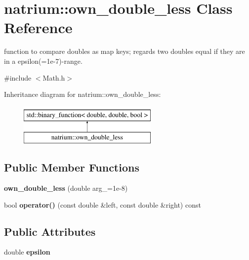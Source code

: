 \hypertarget{classnatrium_1_1own__double__less}{\section{natrium\-:\-:own\-\_\-double\-\_\-less Class Reference}
\label{classnatrium_1_1own__double__less}
}


function to compare doubles as map keys; regards two doubles equal if they are in a epsilon(=1e-\/7)-\/range.  




{\ttfamily \#include $<$Math.\-h$>$}

Inheritance diagram for natrium\-:\-:own\-\_\-double\-\_\-less\-:\begin{figure}[H]
\begin{center}
\leavevmode
\includegraphics[height=2.000000cm]{classnatrium_1_1own__double__less}
\end{center}
\end{figure}
\subsection*{Public Member Functions}
\begin{DoxyCompactItemize}
\item 
\hypertarget{classnatrium_1_1own__double__less_ad0801e961db1be7a8752237d551bb016}{{\bfseries own\-\_\-double\-\_\-less} (double arg\-\_\-=1e-\/8)}\label{classnatrium_1_1own__double__less_ad0801e961db1be7a8752237d551bb016}

\item 
\hypertarget{classnatrium_1_1own__double__less_a79f21afda2b0b72708c20ce78080dbc7}{bool {\bfseries operator()} (const double \&left, const double \&right) const }\label{classnatrium_1_1own__double__less_a79f21afda2b0b72708c20ce78080dbc7}

\end{DoxyCompactItemize}
\subsection*{Public Attributes}
\begin{DoxyCompactItemize}
\item 
\hypertarget{classnatrium_1_1own__double__less_a5de868df983787412438c481c21621a7}{double {\bfseries epsilon}}\label{classnatrium_1_1own__double__less_a5de868df983787412438c481c21621a7}

\end{DoxyCompactItemize}


